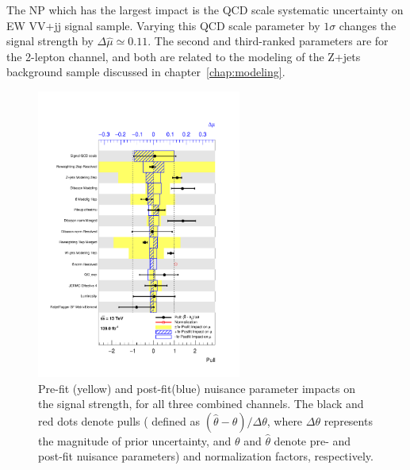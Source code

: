 The NP which has the largest impact is the QCD scale systematic uncertainty on EW VV+jj signal sample. 
Varying this QCD scale parameter by $1\sigma$ changes the signal strength by $\Delta \hat{\mu} \simeq 0.11$.
The second and third-ranked parameters are for the 2-lepton channel, and both are related to the modeling of the Z+jets background sample discussed in chapter~\ref{chap:modeling}.
\begin{figure}[ht]
      \centering
        \includegraphics[width=0.60\textwidth]{figures/2lep/FitResults/pulls_mu_SemileptonicVBS_5.pdf}
        \caption{Pre-fit (yellow) and post-fit(blue) nuisance parameter impacts on the signal strength, for all three combined channels. The black and red dots denote pulls ( defined as $(\hat{\theta}-\theta) / \Delta \theta$, where $\Delta \theta$ represents the magnitude of prior uncertainty, and $\theta$ and $\hat{\theta}$ denote pre- and post-fit nuisance parameters) and normalization factors, respectively. %
        }
       \label{fig:fit_2lep_ranking_all}
\end{figure}


